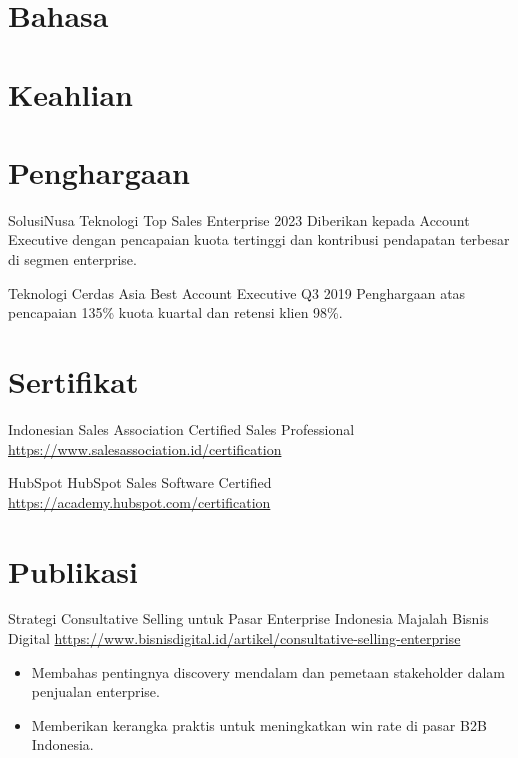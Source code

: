 \documentclass[a4paper, serif, 10pt]{moderncv}
\begin{document}
\section{Bahasa}

\section{Keahlian}

\section{Penghargaan}

        {SolusiNusa Teknologi}
        {Top Sales Enterprise 2023}
        {}
        {}
        {Diberikan kepada Account Executive dengan pencapaian kuota tertinggi dan kontribusi pendapatan terbesar di segmen enterprise.}

        {Teknologi Cerdas Asia}
        {Best Account Executive Q3 2019}
        {}
        {}
        {Penghargaan atas pencapaian 135\% kuota kuartal dan retensi klien 98\%.}
\section{Sertifikat}

        {Indonesian Sales Association}
        {Certified Sales Professional}
        {\url{https://www.salesassociation.id/certification}}
        {}
        {}

        {HubSpot}
        {HubSpot Sales Software Certified}
        {\url{https://academy.hubspot.com/certification}}
        {}
        {}
\section{Publikasi}

        {Strategi Consultative Selling untuk Pasar Enterprise Indonesia}
        {Majalah Bisnis Digital}
        {\url{https://www.bisnisdigital.id/artikel/consultative-selling-enterprise}}
        {}
        {\begin{itemize}
\item Membahas pentingnya discovery mendalam dan pemetaan stakeholder dalam penjualan enterprise.
\item Memberikan kerangka praktis untuk meningkatkan win rate di pasar B2B Indonesia.
\end{itemize}}
\end{document}
